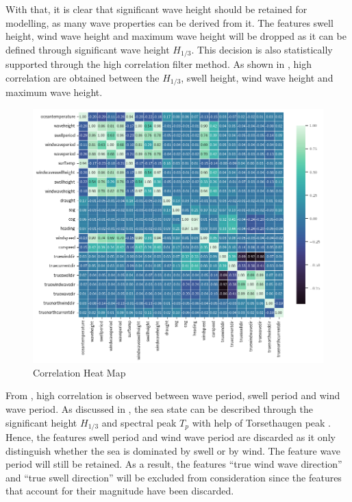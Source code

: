 With that, it is clear that significant wave height should be retained for modelling, as many wave properties can be derived from it. The features swell height, wind wave height and maximum wave height will be dropped as it can be defined through significant wave height $H_{1/3}$. This decision is also statistically supported through the high correlation filter method. As shown in , high correlation are obtained between the $H_{1/3}$, swell height, wind wave height and maximum wave height.\\

\begin{figure}[ht]
    \centering
    \includegraphics[width=.9\linewidth,height=.9\textheight,keepaspectratio]{02_figures/heatmap_corr_ovr.png}
    \caption{Correlation Heat Map}
    \label{fig:heatmap_ovr}
\end{figure}

From , high correlation is observed between wave period, swell period and wind wave period. As discussed in , the sea state can be described through the significant height $H_{1/3}$ and spectral peak $T_p$ with help of Torsethaugen peak . Hence, the features swell period and wind wave period are discarded as it only distinguish whether the sea is dominated by swell or by wind. The feature wave period will still be retained. As a result, the features ``true wind wave direction'' and ``true swell direction'' will be excluded from consideration since the features that account for their magnitude have been discarded.\\

